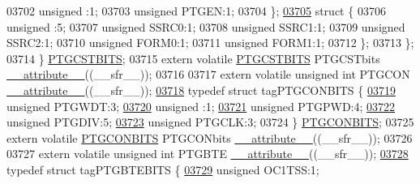 \begin{DoxyCode}
03702       \textcolor{keywordtype}{unsigned} :1;
03703       \textcolor{keywordtype}{unsigned} PTGEN:1;
03704     \};
\hypertarget{a00009_source_l03705}{}\hyperlink{a00009}{03705}     \textcolor{keyword}{struct }\{
03706       \textcolor{keywordtype}{unsigned} :5;
03707       \textcolor{keywordtype}{unsigned} SSRC0:1;
03708       \textcolor{keywordtype}{unsigned} SSRC1:1;
03709       \textcolor{keywordtype}{unsigned} SSRC2:1;
03710       \textcolor{keywordtype}{unsigned} FORM0:1;
03711       \textcolor{keywordtype}{unsigned} FORM1:1;
03712     \};
03713   \};
03714 \} \hyperlink{a00008_d5/d4e/a00660}{PTGCSTBITS};
03715 \textcolor{keyword}{extern} \textcolor{keyword}{volatile} \hyperlink{a00008_d5/d4e/a00660}{PTGCSTBITS} PTGCSTbits \hyperlink{a00009_a493c46f03454991ccc5aa7a6e1dfb2a7}{\_\_attribute\_\_}((\_\_sfr\_\_));
03716 
03717 \textcolor{keyword}{extern} \textcolor{keyword}{volatile} \textcolor{keywordtype}{unsigned} \textcolor{keywordtype}{int}  PTGCON \hyperlink{a00009_a493c46f03454991ccc5aa7a6e1dfb2a7}{\_\_attribute\_\_}((\_\_sfr\_\_));
\hypertarget{a00009_source_l03718}{}\hyperlink{a00008}{03718} \textcolor{keyword}{typedef} \textcolor{keyword}{struct }tagPTGCONBITS \{
\hypertarget{a00009_source_l03719}{}\hyperlink{a00008_a176187b8627a34a5038498db3c1a632d}{03719}   \textcolor{keywordtype}{unsigned} PTGWDT:3;
\hypertarget{a00009_source_l03720}{}\hyperlink{a00008_adf71f3d8410c1f1dbbc96680a92c49af}{03720}   \textcolor{keywordtype}{unsigned} :1;
\hypertarget{a00009_source_l03721}{}\hyperlink{a00008_a24a9b9391e229bfc62ce56a10fe2e0f9}{03721}   \textcolor{keywordtype}{unsigned} PTGPWD:4;
\hypertarget{a00009_source_l03722}{}\hyperlink{a00008_a6831a3bfc105c111623e903cd3b76339}{03722}   \textcolor{keywordtype}{unsigned} PTGDIV:5;
\hypertarget{a00009_source_l03723}{}\hyperlink{a00008_acfbbd794489cadb4287cfd2ed6ad09cc}{03723}   \textcolor{keywordtype}{unsigned} PTGCLK:3;
03724 \} \hyperlink{a00008_dc/d91/a00659}{PTGCONBITS};
03725 \textcolor{keyword}{extern} \textcolor{keyword}{volatile} \hyperlink{a00008_dc/d91/a00659}{PTGCONBITS} PTGCONbits \hyperlink{a00009_a493c46f03454991ccc5aa7a6e1dfb2a7}{\_\_attribute\_\_}((\_\_sfr\_\_));
03726 
03727 \textcolor{keyword}{extern} \textcolor{keyword}{volatile} \textcolor{keywordtype}{unsigned} \textcolor{keywordtype}{int}  PTGBTE \hyperlink{a00009_a493c46f03454991ccc5aa7a6e1dfb2a7}{\_\_attribute\_\_}((\_\_sfr\_\_));
\hypertarget{a00009_source_l03728}{}\hyperlink{a00008}{03728} \textcolor{keyword}{typedef} \textcolor{keyword}{struct }tagPTGBTEBITS \{
\hypertarget{a00009_source_l03729}{}\hyperlink{a00008_a91fbf6e4b30a29980a14616e5371f553}{03729}   \textcolor{keywordtype}{unsigned} OC1TSS:1;

\end{DoxyCode}
